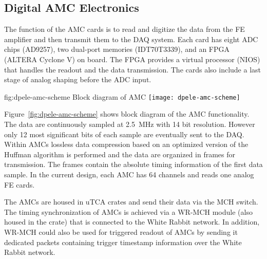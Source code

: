 
\subsection{Digital AMC Electronics}
\label{sec:fddp-tpc-elec-design-amc}

The function of the AMC cards is to read and digitize the data from the FE amplifier and then transmit them to the DAQ system. Each card has eight ADC chips (AD9257), two dual-port memories (IDT70T3339), and an FPGA (ALTERA Cyclone V) on board. The FPGA provides a virtual processor (NIOS) that handles the readout and the data transmission.  The cards also include a last stage of analog shaping before the ADC input.

\begin{dunefigure}{fig:dpele-amc-scheme}
{Block diagram of AMC}
\texttt{[image: dpele-amc-scheme]}
\end{dunefigure}

Figure~\ref{fig:dpele-amc-scheme} shows block diagram of the AMC functionality. The data are continuously sampled at \SI{2.5}{\MHz} with \num{14} bit resolution. However only \num{12} most significant bits of each sample are eventually sent to the DAQ. Within AMCs lossless data compression based on an optimized version of the Huffman algorithm is performed and the data are organized in frames for transmission. The frames contain the absolute timing information of the first data sample.  In the current design, each AMC has 64 channels and reads one analog FE cards.

The AMCs are housed in uTCA crates and send their data via the MCH switch. The timing synchronization of AMCs is achieved via a WR-MCH module (also housed in the crate) that is connected to the White Rabbit network. In addition, WR-MCH could also be used for triggered readout of AMCs by sending it dedicated packets containing trigger timestamp information over the White Rabbit network.

